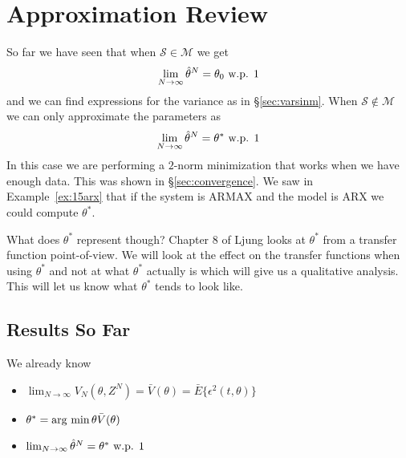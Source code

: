 \mainmatter%
\setcounter{page}{1}

\lectureseries[\course]{\course}

\date{November 19, 2009}

\setaddress%

\setcounter{lecture}{15}
\setcounter{chapter}{15}


\section{Approximation Review}
So far we have seen that when $\mathcal{S}\in\mathcal{M}$ we get
$$\lim_{N\to\infty}\hat{\theta}^N=\theta_0 \text{ w.p. } 1$$
and we can find expressions for the variance as in \S\ref{sec:varsinm}.
When $\mathcal{S}\notin\mathcal{M}$ we can only approximate the parameters as
$$\lim_{N\to\infty}\hat{\theta}^N=\theta^\ast \text{ w.p. } 1$$
In this case we are performing a $2$-norm minimization that works when we have enough data.
This was shown in \S\ref{sec:convergence}.
We saw in Example~\ref{ex:15arx} that if the system is ARMAX and the model is ARX we could compute $\theta^\ast$.

What does $\theta^\ast$ represent though? Chapter 8 of Ljung looks at $\theta^\ast$ from a transfer function point-of-view.
We will look at the effect on the transfer functions when using $\theta^\ast$ and not at what $\theta^\ast$ actually is which will give us a qualitative analysis.
This will let us know what $\theta^\ast$ tends to look like.

\subsection{Results So Far}
We already know
\begin{itemize}
\item $\lim_{N\to\infty}V_N(\theta,Z^N) = \bar{V}(\theta) = \bar{E}\{\epsilon^2(t,\theta)\}$
\item $\theta^\ast = \mathop{\arg\,\min}\limits{\theta}\bar{V}(\theta)$
\item $\lim_{N\to\infty}\hat{\theta}^N = \theta^\ast \text{ w.p. } 1$
\end{itemize}

